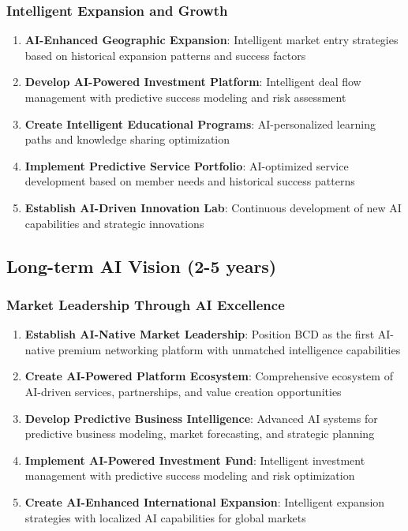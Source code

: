 \subsubsection{Intelligent Expansion and Growth}

\begin{enumerate}
    \item \textbf{AI-Enhanced Geographic Expansion}: Intelligent market entry strategies based on historical expansion patterns and success factors
    \item \textbf{Develop AI-Powered Investment Platform}: Intelligent deal flow management with predictive success modeling and risk assessment
    \item \textbf{Create Intelligent Educational Programs}: AI-personalized learning paths and knowledge sharing optimization
    \item \textbf{Implement Predictive Service Portfolio}: AI-optimized service development based on member needs and historical success patterns
    \item \textbf{Establish AI-Driven Innovation Lab}: Continuous development of new AI capabilities and strategic innovations
\end{enumerate}

\subsection{Long-term AI Vision (2-5 years)}

\subsubsection{Market Leadership Through AI Excellence}

\begin{enumerate}
    \item \textbf{Establish AI-Native Market Leadership}: Position BCD as the first AI-native premium networking platform with unmatched intelligence capabilities
    \item \textbf{Create AI-Powered Platform Ecosystem}: Comprehensive ecosystem of AI-driven services, partnerships, and value creation opportunities
    \item \textbf{Develop Predictive Business Intelligence}: Advanced AI systems for predictive business modeling, market forecasting, and strategic planning
    \item \textbf{Implement AI-Powered Investment Fund}: Intelligent investment management with predictive success modeling and risk optimization
    \item \textbf{Create AI-Enhanced International Expansion}: Intelligent expansion strategies with localized AI capabilities for global markets
\end{enumerate}


